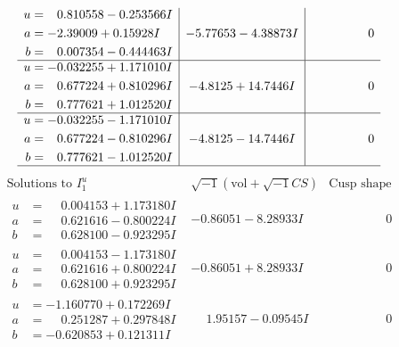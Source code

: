 \documentclass[1p]{elsarticle_modified}
\theoremstyle{definition}
\newcommand{\I}{\sqrt{-1}}
\begin{document}
$$\begin{array}{c|c|c}
\begin{aligned}
u &= \phantom{-}0.810558 - 0.253566 I \\
a &= -2.39009 + 0.15928 I \\
b &= \phantom{-}0.007354 - 0.444463 I\end{aligned}
 & -5.77653 - 4.38873 I & \phantom{-0.000000 } 0 \\ \hline\begin{aligned}
u &= -0.032255 + 1.171010 I \\
a &= \phantom{-}0.677224 + 0.810296 I \\
b &= \phantom{-}0.777621 + 1.012520 I\end{aligned}
 & -4.8125 + 14.7446 I & \phantom{-0.000000 } 0 \\ \hline\begin{aligned}
u &= -0.032255 - 1.171010 I \\
a &= \phantom{-}0.677224 - 0.810296 I \\
b &= \phantom{-}0.777621 - 1.012520 I\end{aligned}
 & -4.8125 - 14.7446 I & \phantom{-0.000000 } 0\\
 \hline 
 \end{array}$$\newpage$$\begin{array}{c|c|c}  
\text{Solutions to }I^u_{1}& \I (\text{vol} + \sqrt{-1}CS) & \text{Cusp shape}\\
 \hline 
\begin{aligned}
u &= \phantom{-}0.004153 + 1.173180 I \\
a &= \phantom{-}0.621616 - 0.800224 I \\
b &= \phantom{-}0.628100 - 0.923295 I\end{aligned}
 & -0.86051 - 8.28933 I & \phantom{-0.000000 } 0 \\ \hline\begin{aligned}
u &= \phantom{-}0.004153 - 1.173180 I \\
a &= \phantom{-}0.621616 + 0.800224 I \\
b &= \phantom{-}0.628100 + 0.923295 I\end{aligned}
 & -0.86051 + 8.28933 I & \phantom{-0.000000 } 0 \\ \hline\begin{aligned}
u &= -1.160770 + 0.172269 I \\
a &= \phantom{-}0.251287 + 0.297848 I \\
b &= -0.620853 + 0.121311 I\end{aligned}
 & \phantom{-}1.95157 - 0.09545 I & \phantom{-0.000000 } 0 \\ \hline\begin{aligned}

\end{aligned}
\end{array}$$
\end{document}
